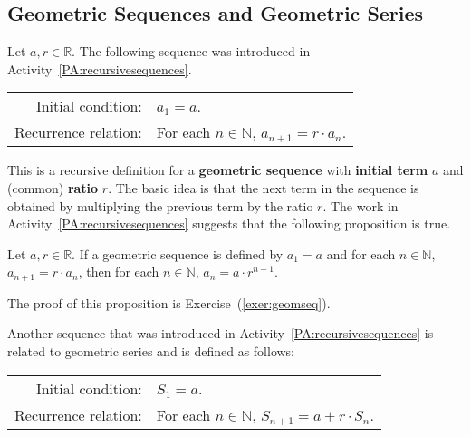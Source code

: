 \subsection*{Geometric Sequences and Geometric Series}
Let  $a,r \in \mathbb{R}$.  The following sequence was introduced in \typeu Activity~\ref*{PA:recursivesequences}.

\begin{tabular}{r l}
Initial condition:    &  $a_1  = a$. \\
Recurrence relation:  &  For each  $n \in \mathbb{N}$,  $a_{n + 1}  = r \cdot a_n $. \\
\end{tabular}

This is a recursive definition for a \textbf{geometric sequence} \label{geomseq}
%
%
 with \textbf{initial term}  $a$  and (common) \textbf{ratio}  $r$.  The basic idea is that the next term in the sequence is obtained by multiplying the previous term by the ratio  $r$.  The work in \typeu Activity~\ref*{PA:recursivesequences} suggests that the following proposition is true.

\begin{theorem} \label{P:geometricsequence}
Let  $a, r \in \mathbb{R}$.  If a geometric sequence is defined by  $a_1  = a$ and for each  $n \in \mathbb{N}$,  $a_{n + 1}  = r \cdot a_n $, then for each  $n \in \mathbb{N}$,   $a_n  = a \cdot r^{n - 1} $.
\end{theorem}

\noindent
The proof of this proposition is Exercise~(\ref{exer:geomseq}).

%
Another sequence that was introduced in \typeu Activity~\ref*{PA:recursivesequences} is related to geometric series and is defined as follows:


\begin{tabular}{r l}
Initial condition:    &  $S_1  = a$. \\
Recurrence relation:  &  For each  $n \in \mathbb{N}$,  $S_{n + 1}  = a + r \cdot S_n $. \\
\end{tabular}

